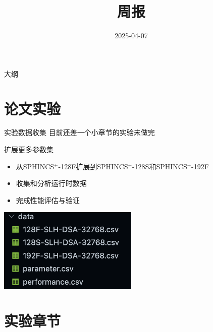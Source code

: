 \documentclass{beamer}
\title{\LARGE{周报}}
\subtitle{}
\author{}
\date{2025-04-07}
\begin{document}
\begin{frame}
  \titlepage
\end{frame}

\begin{frame}{大纲}
  \tableofcontents
\end{frame}

\section{论文实验}
\begin{frame}{实验数据收集}
  目前还差一个小章节的实验未做完
  \begin{block}{扩展更多参数集}
    \begin{itemize}
      \item 从SPHINCS$^+$-128F扩展到SPHINCS$^+$-128S和SPHINCS$^+$-192F
      \item 收集和分析运行时数据
      \item 完成性能评估与验证
    \end{itemize}
  \end{block}

  \begin{center}
    \includegraphics[width=0.5\textwidth]{./fig/data-collection.png}
  \end{center}
\end{frame}

\section{实验章节}
\end{document}
